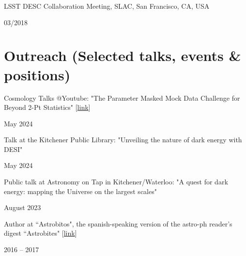 \documentclass[12pt, a4paper]{article} %
\begin{document}
\begin{minipage}[t]{0.7\textwidth}
\begin{flushleft}%
  \setlength{\leftskip}{0.2cm}%
LSST DESC Collaboration Meeting, SLAC, San Francisco, CA, USA
\end{flushleft}
\end{minipage}
\begin{minipage}[t]{0.3\textwidth}
\hfill 03/2018
\end{minipage}


\section*{Outreach (Selected talks, events \& positions)}

\begin{minipage}[t]{0.7\textwidth}
\begin{flushleft}%
  \setlength{\leftskip}{0.2cm}%
    Cosmology Talks @Youtube: "The Parameter Masked Mock Data Challenge for Beyond 2-Pt Statistics" [\href{https://youtu.be/LPykO2206OY?si=71c5Zk-nbmWmK4QL}{link}]
\end{flushleft}
\end{minipage}
\begin{minipage}[t]{0.3\textwidth}
\hfill May 2024
\end{minipage}
\vspace{0.2cm}

\begin{minipage}[t]{0.7\textwidth}
\begin{flushleft}%
  \setlength{\leftskip}{0.2cm}%
Talk at the Kitchener Public Library: "Unveiling the nature of dark energy with DESI"
\end{flushleft}
\end{minipage}
\begin{minipage}[t]{0.3\textwidth}
\hfill May 2024
\end{minipage}
\vspace{0.2cm}

\begin{minipage}[t]{0.7\textwidth}
\begin{flushleft}%
  \setlength{\leftskip}{0.2cm}%
Public talk at Astronomy on Tap in Kitchener/Waterloo: "A quest for dark energy: mapping the Universe on the largest scales"
\end{flushleft}
\end{minipage}
\begin{minipage}[t]{0.3\textwidth}
\hfill August 2023
\end{minipage}
\vspace{0.2cm}

\begin{minipage}[t]{0.7\textwidth}
\begin{flushleft}%
  \setlength{\leftskip}{0.2cm}%
Author at ``Astrobitos", the spanish-speaking version of the astro-ph reader's digest ``Astrobites" 
 [\href{https://www.astrobitos.org}{link}]
\end{flushleft}
\end{minipage}
\begin{minipage}[t]{0.3\textwidth}
\hfill 2016 -- 2017
\end{minipage}
\end{document}

